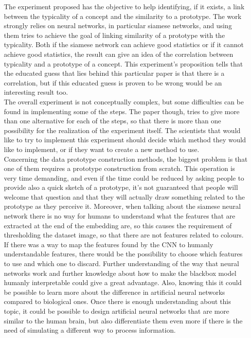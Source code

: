 \documentclass[conference]{IEEEtran}
\begin{document}
		\noindent The experiment proposed has the objective to help identifying, if it exists, a link between the typicality of a concept and the similarity to a prototype. The work strongly relies on neural networks, in 
		particular siamese networks, and using them tries to achieve the goal of linking similarity of a prototype with the typicality. Both if the siamese network can achieve good statistics or if it cannot achieve 
		good statistics, the result can give an idea of the correlation between typicality and a prototype of a concept. This experiment's proposition tells that the educated guess that lies behind this particular paper 
		is that there is a correlation, but if this educated guess is proven to be wrong would be an interesting result too.\\
		The overall experiment is not conceptually complex, but some difficulties can be found in implementing some of the steps. The paper though, tries to give more than one alternative for each of the steps, so that there 
		is more than one possibility for the realization of the experiment itself. The scientists that would like to try to implement this experiment should decide which method they would like to implement, or if they 
		want to create a new method to use.\\
		Concerning the data prototype construction methods, the biggest problem is that one of them requires a prototype construction from scratch. This operation is very time demanding, and even if the time could 
		be reduced by asking people to provide also a quick sketch of a prototype, it's not guaranteed that people will welcome that question and that they will actually draw something related to the prototype as they 
		perceive it. Moreover, when talking about the siamese neural network there is no way for humans to understand what the features that are extracted at the end of the embedding are, so this causes the requirement of 
		thresholding the dataset image, so that there are not features related to colours. If there was a way to map the features found by the CNN to humanly understandable features, there would be the possibility to 
		choose which features to use and which one to discard. Further understanding of the way that neural networks work and further knowledge about how to make the blackbox model humanly interpretable could give a great 
		advantage. Also, knowing this it could be possible to learn more about the difference in artificial neural networks compared to biological ones. Once there is enough understanding about this topic, it could be possible 
		to design artificial neural networks that are more similar to the human brain, but also differentiate them even more if there is the need of simulating a different way to process information. \\ 
		
	\nocite{*}
	\printbibliography
\end{document}
